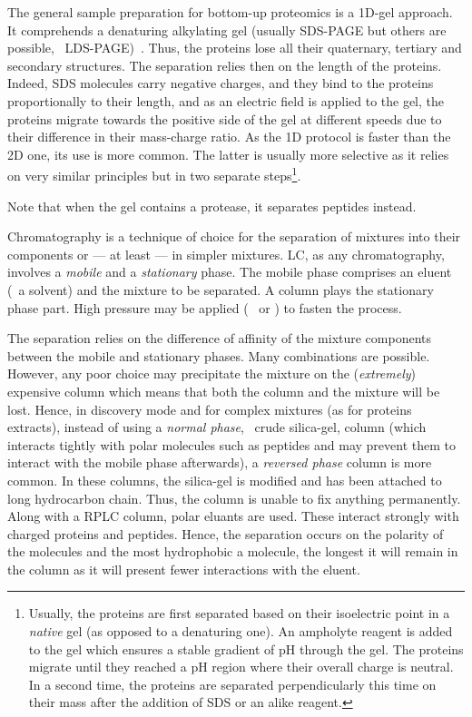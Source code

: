 The general sample preparation for bottom-up proteomics is a 1D-gel approach.
It comprehends a denaturing alkylating gel (usually \gls{SDS-PAGE} but others are
possible, \eg\ \gls{LDS-PAGE})~. Thus, the proteins lose
all their quaternary, tertiary and secondary structures. The separation relies
then on the length of the proteins. Indeed, \gls{SDS} molecules carry negative
charges, and they bind to the proteins proportionally to their length, and as an
electric field is applied to the gel, the proteins migrate towards the positive
side of the gel at different speeds due to their difference in their mass-charge
ratio. As the 1D protocol is faster than the 2D one, its use is more common. The latter is
usually more selective as it relies on very similar principles but in two separate
steps\footnote{Usually, the proteins are first separated based on their
isoelectric point in a \emph{native} gel (as opposed to a denaturing one).
An \gls{ampholyte} reagent is added to the gel which ensures a stable
gradient of \gls{pH} through the gel. The proteins migrate until they reached a
\gls{pH} region where their overall charge is neutral. In a second time, the
proteins are separated perpendicularly this time on their mass after the addition
of \gls{SDS} or an alike reagent.}.

Note that when the gel contains a protease, it separates peptides instead.


\vspace{-0.5mm}
Chromatography is a technique of choice for the separation of mixtures into their
components or --- at least --- in simpler mixtures. \gls{LC}, as any
chromatography, involves a \emph{mobile} and a \emph{stationary} phase.
The mobile phase comprises an eluent (\ie\ a solvent) and the mixture to be
separated. A column plays the stationary phase part.
High pressure may be applied (\eg\  or )
to fasten the process.

\vspace{-0.5mm}
The separation relies on the difference of affinity of the mixture components
between the mobile and stationary phases. Many combinations are possible. However,
any poor choice may precipitate the mixture on the (\emph{extremely})
expensive column which means that both the column and the mixture will be lost.
Hence, in discovery mode and for complex mixtures (as for proteins extracts),
instead of using a \emph{normal phase}, \ie\ crude silica-gel, column (which
interacts tightly with polar molecules such as peptides and may prevent them to
interact with the mobile phase afterwards), a \emph{reversed phase} column
is more common. In these columns, the silica-gel is modified and has been
attached to long hydrocarbon chain. Thus, the column is unable to fix anything
permanently. Along with a \gls{RPLC} column, polar eluants are used. These
interact strongly with charged proteins and peptides. Hence, the separation
occurs on the polarity of the molecules and the most hydrophobic a molecule,
the longest it will remain in the column as it will present fewer interactions
with the eluent.

